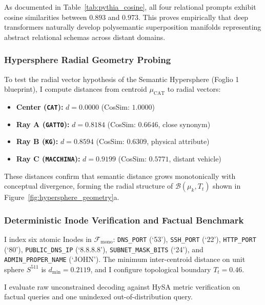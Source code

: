 \documentclass[10pt,twocolumn]{article}
\theoremstyle{definition}
\begin{document}
As documented in Table~\ref{tab:pythia_cosine}, all four relational prompts exhibit cosine similarities between $\mathbf{0.893}$ and $\mathbf{0.973}$. This proves empirically that deep transformers naturally develop polysemantic superposition manifolds representing abstract relational schemas across distant domains.

\subsubsection{Hypersphere Radial Geometry Probing}
To test the radial vector hypothesis of the Semantic Hypersphere (Foglio 1 blueprint), I compute distances from centroid $\mu_{\mathrm{CAT}}$ to radial vectors:
\begin{itemize}[leftmargin=*, itemsep=1.0pt]
    \item \textbf{Center (\texttt{CAT}):} $d = 0.0000$ (CosSim: $1.0000$)
    \item \textbf{Ray A (\texttt{GATTO}):} $d = 0.8184$ (CosSim: $0.6646$, close synonym)
    \item \textbf{Ray B (\texttt{KG}):} $d = 0.8594$ (CosSim: $0.6309$, physical attribute)
    \item \textbf{Ray C (\texttt{MACCHINA}):} $d = 0.9199$ (CosSim: $0.5771$, distant vehicle)
\end{itemize}
These distances confirm that semantic distance grows monotonically with conceptual divergence, forming the radial structure of $\mathcal{B}(\mu_k, T_t)$ shown in Figure~\ref{fig:hypersphere_geometry}a.

\subsubsection{Deterministic Inode Verification and Factual Benchmark}
I index six atomic Inodes in $\mathcal{F}_{\mathrm{mono}}$: \texttt{DNS\_PORT} (`53'), \texttt{SSH\_PORT} (`22'), \texttt{HTTP\_PORT} (`80'), \texttt{PUBLIC\_DNS\_IP} (`8.8.8.8'), \texttt{SUBNET\_MASK\_BITS} (`24'), and \texttt{ADMIN\_PROPER\_NAME} (`JOHN'). The minimum inter-centroid distance on unit sphere $S^{511}$ is $d_{\min} = 0.2119$, and I configure topological boundary $T_t = 0.46$.

I evaluate raw unconstrained decoding against HySA metric verification on factual queries and one unindexed out-of-distribution query.
\end{document}
